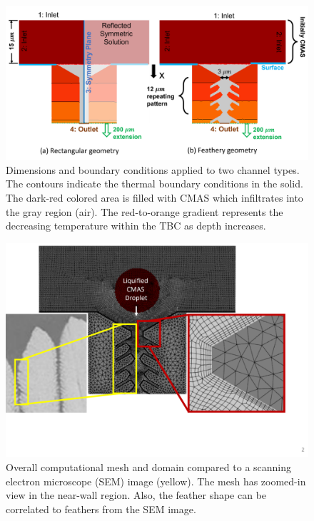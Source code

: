\documentclass{UCF_ETD}
\begin{document}
\begin{figure}
    \centering
    \includegraphics[width=0.9\linewidth]{Figures/dimensionsTwoView.png}
    \caption{Dimensions and boundary conditions applied to two channel types. The contours indicate the thermal boundary conditions in the solid. The dark-red colored area is filled with CMAS which infiltrates into the gray region (air). The red-to-orange gradient represents the decreasing temperature within the TBC as depth increases.}
    \label{fig:dimensions}
\end{figure}


\begin{figure}[htp!]
\centering
\includegraphics[width=\linewidth]{Figures/mesh_and_sem_compare.png}
\caption{Overall computational mesh and domain compared to a scanning electron microscope (SEM) image (yellow). The mesh has zoomed-in view in the near-wall region. Also, the feather shape can be correlated to feathers from the SEM image.}
\label{fig:mesh}
\end{figure}
\end{document}
